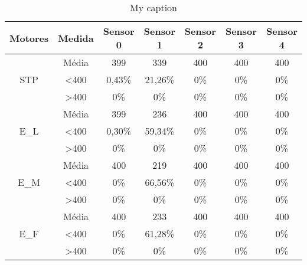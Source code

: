 \begin{table}[]
\centering
\caption{My caption}
\label{my-label}
\begin{tabular}{|c|c|ccccc|}
\hline
\textbf{Motores}                & \textbf{Medida}  & \textbf{Sensor 0} & \textbf{Sensor 1} & \textbf{Sensor 2} & \textbf{Sensor 3} & \textbf{Sensor 4} \\ \hline
\multirow{3}{*}{STP}            & Média            & 399               & 339               & 400               & 400               & 400               \\
                                & \textless 400    & 0,43\%            & 21,26\%           & 0\%            & 0\%            & 0\%            \\
                                & \textgreater 400 & 0\%            & 0\%            & 0\%            & 0\%            & 0\%            \\ \hline
\multirow{3}{*}{E\_L}           & Média            & 399               & 236               & 400               & 400               & 400               \\
                                & \textless 400    & 0,30\%            & 59,34\%           & 0\%            & 0\%            & 0\%            \\
                                & \textgreater 400 & 0\%            & 0\%            & 0\%            & 0\%            & 0\%            \\ \hline
\multirow{3}{*}{E\_M}           & Média            & 400               & 219               & 400               & 400               & 400               \\
                                & \textless 400    & 0\%            & 66,56\%           & 0\%            & 0\%            & 0\%            \\
                                & \textgreater 400 & 0\%            & 0\%            & 0\%            & 0\%            & 0\%            \\ \hline
\multirow{3}{*}{E\_F}           & Média            & 400               & 233               & 400               & 400               & 400               \\
                                & \textless 400    & 0\%            & 61,28\%           & 0\%            & 0\%            & 0\%            \\
                                & \textgreater 400 & 0\%            & 0\%            & 0\%            & 0\%            & 0\%            \\ \hline

\end{tabular}
\end{table}
